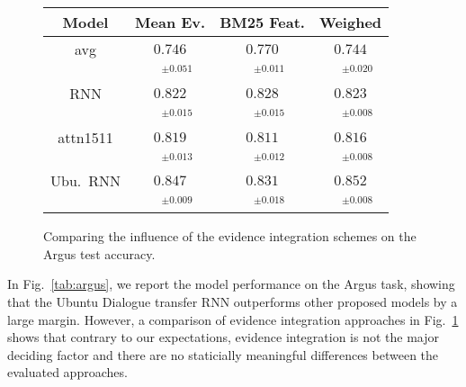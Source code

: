 \documentclass[11pt]{article}
\begin{document}
\begin{figure}[t]
\centering
\setlength{\tabcolsep}{3pt}
\begin{tabular}{|c|c|c|c|}
\hline
Model              & Mean Ev. & BM25 Feat. & Weighed \\
\hline
avg & $0.746$ & $0.770$ & $0.744$\\
 & $\quad^{\pm0.051}$ & $\quad^{\pm0.011}$ & $\quad^{\pm0.020}$\\
\hline
RNN & $0.822$ & $0.828$ & $0.823$\\
 & $\quad^{\pm0.015}$ & $\quad^{\pm0.015}$ & $\quad^{\pm0.008}$\\
attn1511 & $0.819$ & $0.811$ & $0.816$\\
 & $\quad^{\pm0.013}$ & $\quad^{\pm0.012}$ & $\quad^{\pm0.008}$\\
Ubu.\ RNN & $0.847$ & $0.831$ & $0.852$\\
 & $\quad^{\pm0.009}$ & $\quad^{\pm0.018}$ & $\quad^{\pm0.008}$\\
\hline
\end{tabular}
\setlength{\tabcolsep}{6pt}
\vspace*{-0.2cm}
\caption{\footnotesize%
	Comparing the influence of the evidence integration schemes on the Argus test accuracy.
}
\label{tab:argusev}
\end{figure}

In Fig.~\ref{tab:argus}, we report the model performance on the Argus task,
showing that the Ubuntu Dialogue transfer RNN outperforms other proposed
models by a large margin.  However, a comparison of evidence integration
approaches in Fig.~\ref{tab:argusev} shows that contrary to our expectations,
evidence integration is not the major deciding factor and there are no
staticially meaningful differences between the evaluated approaches.
\end{document}
